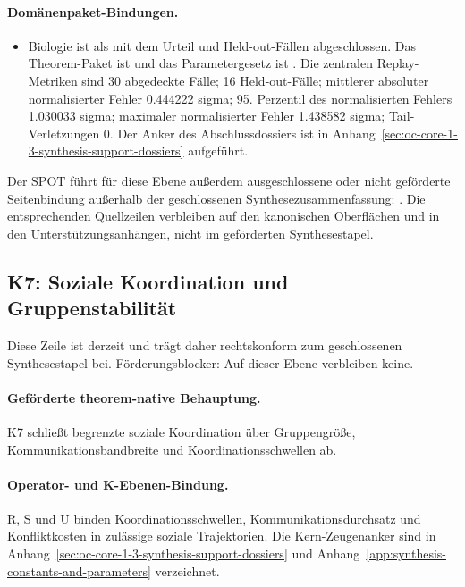 \paragraph{Domänenpaket-Bindungen.}
\begin{itemize}[leftmargin=1.6em,nosep]
\item Biologie ist als  mit dem Urteil  und  Held-out-Fällen abgeschlossen. Das Theorem-Paket ist  und das Parametergesetz ist . Die zentralen Replay-Metriken sind 30 abgedeckte Fälle; 16 Held-out-Fälle; mittlerer absoluter normalisierter Fehler 0.444222 sigma; 95. Perzentil des normalisierten Fehlers 1.030033 sigma; maximaler normalisierter Fehler 1.438582 sigma; Tail-Verletzungen 0. Der Anker des Abschlussdossiers ist in Anhang~\ref{sec:oc-core-1-3-synthesis-support-dossiers} aufgeführt.
\end{itemize}
Der SPOT führt für diese Ebene außerdem  ausgeschlossene oder nicht geförderte Seitenbindung außerhalb der geschlossenen Synthesezusammenfassung: . Die entsprechenden Quellzeilen verbleiben auf den kanonischen Oberflächen und in den Unterstützungsanhängen, nicht im geförderten Synthesestapel.

\subsection{K7: Soziale Koordination und Gruppenstabilität}
\label{sec:oc-core-1-3-synthesis-k7}
Diese Zeile ist derzeit  und trägt daher rechtskonform zum geschlossenen Synthesestapel bei.
Förderungsblocker: Auf dieser Ebene verbleiben keine.

\paragraph{Geförderte theorem-native Behauptung.}
K7 schließt begrenzte soziale Koordination über Gruppengröße, Kommunikationsbandbreite und Koordinationsschwellen ab.

\paragraph{Operator- und K-Ebenen-Bindung.}
R, S und U binden Koordinationsschwellen, Kommunikationsdurchsatz und Konfliktkosten in zulässige soziale Trajektorien.
Die Kern-Zeugenanker sind in Anhang~\ref{sec:oc-core-1-3-synthesis-support-dossiers} und Anhang~\ref{app:synthesis-constants-and-parameters} verzeichnet.

